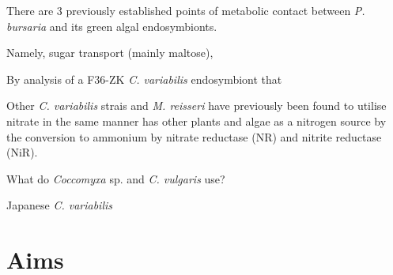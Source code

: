 %
%
%
%
%
%
%
%
%
%
%
%
%
%
%



There are 3 previously established points of metabolic contact between 
\textit{P. bursaria} and its green algal endosymbionts. 

Namely, sugar transport (mainly maltose), 

By analysis of a F36-ZK \textit{C. variabilis} \citep{Hoshina2010} endosymbiont
that 


Other \textit{C. variabilis} strais 
and \textit{M. reisseri} have previously been found to utilise nitrate 
in the same manner has other plants and algae as a nitrogen
source by the conversion to ammonium by nitrate reductase (NR)
and nitrite reductase (NiR).


What do \textit{Coccomyxa} sp. and \textit{C. vulgaris} use?



Japanese \textit{C. variabilis} 



\section{Aims}

